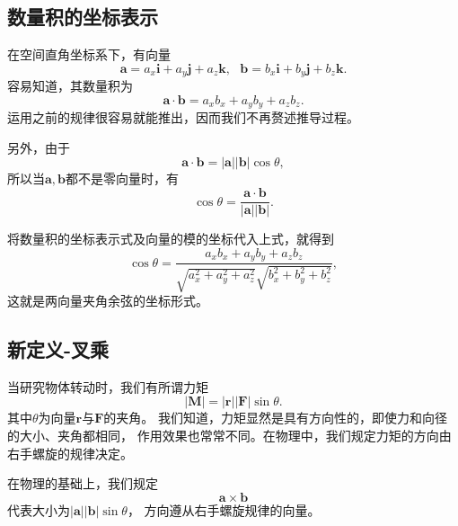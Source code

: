 \subsection{数量积的坐标表示}
在空间直角坐标系下，有向量 
\begin{equation}
    \boldsymbol{a}=a_x\boldsymbol{i}+a_y\boldsymbol{j}
    +a_z\boldsymbol{k},~~~\boldsymbol{b}=b_x\boldsymbol{i}
    +b_y\boldsymbol{j}+b_z\boldsymbol{k}.
\end{equation}
容易知道，其数量积为
\begin{equation}
    \boldsymbol{a}\cdot \boldsymbol{b}=a_xb_x+a_yb_y+a_zb_z.
\end{equation}
运用之前的规律很容易就能推出，因而我们不再赘述推导过程。

另外，由于
\begin{equation}
    \boldsymbol{a}\cdot \boldsymbol{b}
    =| \boldsymbol{a}| |\boldsymbol{b} | \cos\theta ,
\end{equation}
所以当$\boldsymbol{a},\boldsymbol{b}$都不是零向量时，有 
\begin{equation}
    \cos\theta=\frac{\boldsymbol{a}\cdot \boldsymbol{b}}
    {| \boldsymbol{a}| |\boldsymbol{b} | }.
\end{equation}

将数量积的坐标表示式及向量的模的坐标代入上式，就得到
\begin{equation}
    \cos\theta =\frac{a_xb_x+a_yb_y+a_zb_z}
    {\sqrt{a_x^2+a_y^2+a_z^2}\sqrt{b_x^2+b_y^2+b_z^2}},
\end{equation}
这就是两向量夹角余弦的坐标形式。
\subsection{新定义-叉乘}
当研究物体转动时，我们有所谓力矩
\begin{equation}
    | \boldsymbol{M}| =| \boldsymbol{r}| |\boldsymbol{F} |\sin\theta .
\end{equation}
其中$\theta $为向量$\boldsymbol{r}$与$\boldsymbol{F}$的夹角。
我们知道，力矩显然是具有方向性的，即使力和向径的大小、夹角都相同，
作用效果也常常不同。在物理中，我们规定力矩的方向由右手螺旋的规律决定。

\begin{definition}
    在物理的基础上，我们规定
    \begin{equation}
        \boldsymbol{a}\times \boldsymbol{b}
    \end{equation}
    代表大小为$| \boldsymbol{a}| |\boldsymbol{b} |\sin\theta $，
    方向遵从右手螺旋规律的向量。
\end{definition}

